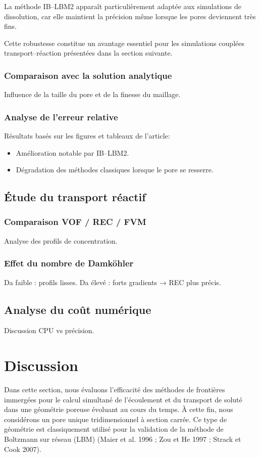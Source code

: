 \documentclass[12pt,a4paper]{report}
\begin{document}
La méthode IB--LBM2 apparaît particulièrement adaptée aux simulations de dissolution, car elle maintient la précision même lorsque les pores deviennent très fins.

Cette robustesse constitue un avantage essentiel pour les simulations couplées transport--réaction présentées dans la section suivante.
\subsection{Comparaison avec la solution analytique}
Influence de la taille du pore et de la finesse du maillage.

\subsection{Analyse de l’erreur relative}
Résultats basés sur les figures et tableaux de l’article:
\begin{itemize}
    \item Amélioration notable par IB–LBM2.
    \item Dégradation des méthodes classiques lorsque le pore se resserre.
\end{itemize}

\section{Étude du transport réactif}
\subsection{Comparaison VOF / REC / FVM}
Analyse des profils de concentration.

\subsection{Effet du nombre de Damköhler}
Da faible : profils lisses.  
Da élevé : forts gradients → REC plus précis.

\section{Analyse du coût numérique}
Discussion CPU vs précision.


\chapter{Discussion}
Dans cette section, nous évaluons l’efficacité des méthodes de frontières immergées pour le calcul simultané de l’écoulement et du transport de soluté dans une géométrie poreuse évoluant au cours du temps. À cette fin, nous considérons un pore unique tridimensionnel à section carrée. Ce type de géométrie est classiquement utilisé pour la validation de la méthode de Boltzmann sur réseau (LBM) (Maier et al. 1996 ; Zou et He 1997 ; Strack et Cook 2007).
\end{document}
